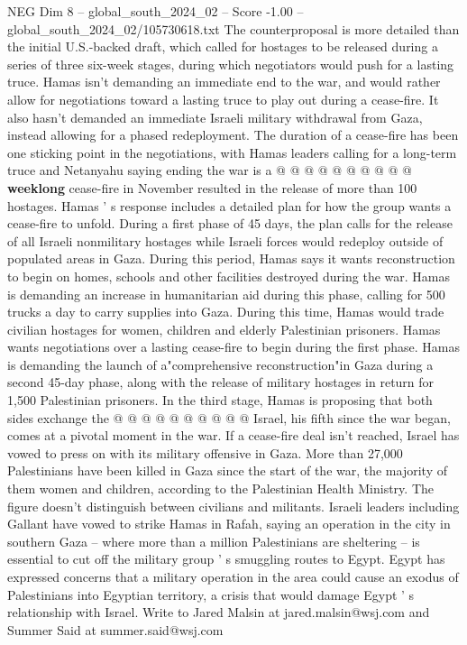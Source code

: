 \begin{textsample}{NEG Dim 8 – global\_south\_2024\_02 – Score -1.00 – global\_south\_2024\_02/105730618.txt}
The counterproposal is more detailed than the initial U.S.-backed draft, which called for hostages to be released during a series of three six-week stages, during which negotiators would push for a lasting truce.
Hamas isn't demanding an immediate end to the war, and would rather allow for negotiations toward a lasting truce to play out during a cease-fire.
It also hasn't demanded an immediate Israeli military withdrawal from Gaza, instead allowing for a phased redeployment.
The duration of a cease-fire has been one sticking point in the negotiations, with Hamas leaders calling for a long-term truce and Netanyahu saying ending the war is a @ @ @ @ @ @ @ @ @ @ \textbf{weeklong} cease-fire in November resulted in the release of more than 100 hostages.
Hamas ' s response includes a detailed plan for how the group wants a cease-fire to unfold.
During a first phase of 45 days, the plan calls for the release of all Israeli nonmilitary hostages while Israeli forces would redeploy outside of populated areas in Gaza.
During this period, Hamas says it wants reconstruction to begin on homes, schools and other facilities destroyed during the war.
Hamas is demanding an increase in humanitarian aid during this phase, calling for 500 trucks a day to carry supplies into Gaza.
During this time, Hamas would trade civilian hostages for women, children and elderly Palestinian prisoners.
Hamas wants negotiations over a lasting cease-fire to begin during the first phase.
Hamas is demanding the launch of a"comprehensive reconstruction"in Gaza during a second 45-day phase, along with the release of military hostages in return for 1,500 Palestinian prisoners.
In the third stage, Hamas is proposing that both sides exchange the @ @ @ @ @ @ @ @ @ @ Israel, his fifth since the war began, comes at a pivotal moment in the war.
If a cease-fire deal isn't reached, Israel has vowed to press on with its military offensive in Gaza.
More than 27,000 Palestinians have been killed in Gaza since the start of the war, the majority of them women and children, according to the Palestinian Health Ministry.
The figure doesn't distinguish between civilians and militants.
Israeli leaders including Gallant have vowed to strike Hamas in Rafah, saying an operation in the city in southern Gaza -- where more than a million Palestinians are sheltering -- is essential to cut off the military group ' s smuggling routes to Egypt.
Egypt has expressed concerns that a military operation in the area could cause an exodus of Palestinians into Egyptian territory, a crisis that would damage Egypt ' s relationship with Israel.
Write to Jared Malsin at jared.malsin@wsj.com and Summer Said at summer.said@wsj.com

\end{textsample}
